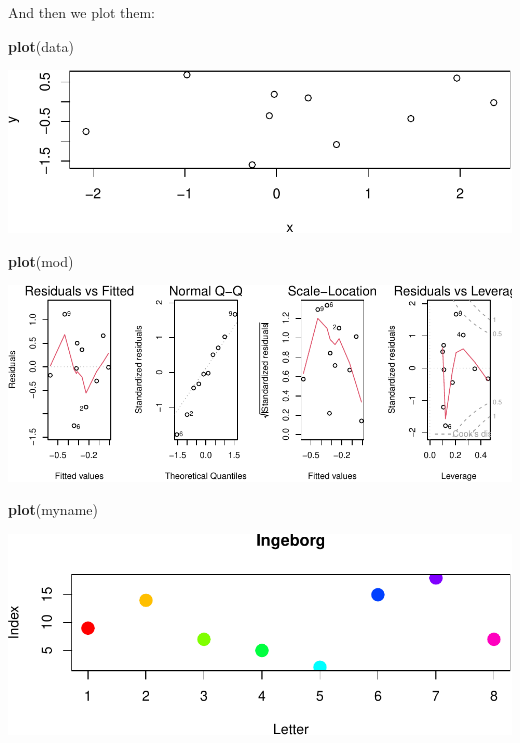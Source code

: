 \documentclass[
]{article}
\newenvironment{Shaded}{\begin{snugshade}}{\end{snugshade}}
\newcommand{\FunctionTok}[1]{\textcolor[rgb]{0.13,0.29,0.53}{\textbf{#1}}}
\newcommand{\NormalTok}[1]{#1}
\begin{document}
And then we plot them:

\begin{Shaded}
\begin{Highlighting}[]
\FunctionTok{plot}\NormalTok{(data)}
\end{Highlighting}
\end{Shaded}

\includegraphics{2MLR_files/figure-latex/unnamed-chunk-64-1.pdf}

\begin{Shaded}
\begin{Highlighting}[]
\FunctionTok{plot}\NormalTok{(mod)}
\end{Highlighting}
\end{Shaded}

\includegraphics{2MLR_files/figure-latex/unnamed-chunk-64-2.pdf}

\begin{Shaded}
\begin{Highlighting}[]
\FunctionTok{plot}\NormalTok{(myname)}
\end{Highlighting}
\end{Shaded}

\includegraphics{2MLR_files/figure-latex/unnamed-chunk-64-3.pdf}
\end{document}
